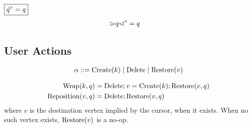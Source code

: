 \noindent $\boxed{\erase{\hat{q}} = q}$
%
\begin{align*}
  \erase{\cursor{q}} &= q
\end{align*}


\subsection{User Actions}

\[
  \arraycolsep=0pt
  \begin{array}{llll}
    \alpha & {}::={} & \Create{k} \mid \Delete \mid \Restore{v} \\
  \end{array}
\]

\begin{align*}
  \Wrap{k, q} &= \Delete; v=\Create{k}; \Restore{v, q} \\
  \Reposition{v, q} &= \Delete; \Restore{v, q} \\
\end{align*}
%
where $v$ is the destination vertex implied by the cursor, when it exists.
When no such vertex exists, $\Restore{v}$ is a no-op.